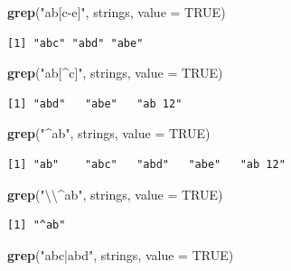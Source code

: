 \documentclass[]{book}
\newenvironment{Shaded}{\begin{snugshade}}{\end{snugshade}}
\newcommand{\CharTok}[1]{\textcolor[rgb]{0.31,0.60,0.02}{#1}}
\newcommand{\DataTypeTok}[1]{\textcolor[rgb]{0.13,0.29,0.53}{#1}}
\newcommand{\KeywordTok}[1]{\textcolor[rgb]{0.13,0.29,0.53}{\textbf{#1}}}
\newcommand{\NormalTok}[1]{#1}
\newcommand{\OtherTok}[1]{\textcolor[rgb]{0.56,0.35,0.01}{#1}}
\newcommand{\StringTok}[1]{\textcolor[rgb]{0.31,0.60,0.02}{#1}}
\theoremstyle{definition}
\theoremstyle{definition}
\theoremstyle{definition}
\theoremstyle{remark}
\begin{document}
\begin{Shaded}
\begin{Highlighting}[]
\KeywordTok{grep}\NormalTok{(}\StringTok{"ab[c-e]"}\NormalTok{, strings, }\DataTypeTok{value =} \OtherTok{TRUE}\NormalTok{)}
\end{Highlighting}
\end{Shaded}

\begin{verbatim}
[1] "abc" "abd" "abe"
\end{verbatim}

\begin{Shaded}
\begin{Highlighting}[]
\KeywordTok{grep}\NormalTok{(}\StringTok{"ab[^c]"}\NormalTok{, strings, }\DataTypeTok{value =} \OtherTok{TRUE}\NormalTok{)}
\end{Highlighting}
\end{Shaded}

\begin{verbatim}
[1] "abd"   "abe"   "ab 12"
\end{verbatim}

\begin{Shaded}
\begin{Highlighting}[]
\KeywordTok{grep}\NormalTok{(}\StringTok{"^ab"}\NormalTok{, strings, }\DataTypeTok{value =} \OtherTok{TRUE}\NormalTok{) }
\end{Highlighting}
\end{Shaded}

\begin{verbatim}
[1] "ab"    "abc"   "abd"   "abe"   "ab 12"
\end{verbatim}

\begin{Shaded}
\begin{Highlighting}[]
\KeywordTok{grep}\NormalTok{(}\StringTok{"}\CharTok{\textbackslash{}\textbackslash{}}\StringTok{^ab"}\NormalTok{, strings, }\DataTypeTok{value =} \OtherTok{TRUE}\NormalTok{) }
\end{Highlighting}
\end{Shaded}

\begin{verbatim}
[1] "^ab"
\end{verbatim}

\begin{Shaded}
\begin{Highlighting}[]
\KeywordTok{grep}\NormalTok{(}\StringTok{"abc|abd"}\NormalTok{, strings, }\DataTypeTok{value =} \OtherTok{TRUE}\NormalTok{) }
\end{Highlighting}
\end{Shaded}
\end{document}
